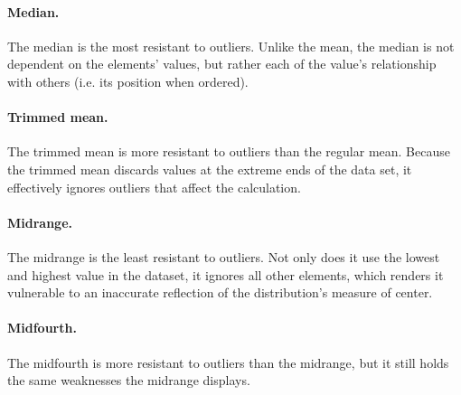 \documentclass{exam}
\begin{document}
\paragraph{Median.} The median is the most resistant to outliers. Unlike the mean, the median is not dependent on the elements' values, but rather each of the value's relationship with others (i.e. its position when ordered).

\paragraph{Trimmed mean.} The trimmed mean is more resistant to outliers than the regular mean. Because the trimmed mean discards values at the extreme ends of the data set, it effectively ignores outliers that affect the calculation.

\paragraph{Midrange.} The midrange is the least resistant to outliers. Not only does it use the lowest and highest value in the dataset, it ignores all other elements, which renders it vulnerable to an inaccurate reflection of the distribution's measure of center.

\paragraph{Midfourth.} The midfourth is more resistant to outliers than the midrange, but it still holds the same weaknesses the midrange displays.
\end{document}
